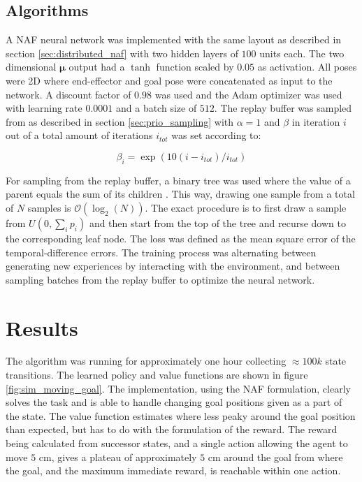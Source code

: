 \subsection{Algorithms}

A NAF neural network was implemented with the same layout as described in
section \ref{sec:distributed_naf} with two hidden layers of $100$ units each.
The two dimensional $\mathbf{\mu}$ output had a $\tanh$ function scaled by $0.05$ as
activation. All poses were 2D where end-effector and goal pose were
concatenated as input to the network. A discount factor of $0.98$ was used and
the Adam optimizer \cite{kingma2014adam} was used with learning rate $0.0001$
and a batch size of $512$. The replay buffer was sampled from as described in
section \ref{sec:prio_sampling} with $\alpha = 1$ and $\beta$ in iteration $i$
out of a total amount of iterations $i_{tot}$ was set according to:

\begin{equation}
    \beta_i = \exp \left( 10(i - i_{tot}) / i_{tot}\right)
\end{equation}

For sampling from the replay buffer, a binary tree was used where the value of
a parent equals the sum of its children \cite{schaul2015prioritized}. This way,
drawing one sample from a total of $N$ samples is $\mathcal{O}(\log_2(N))$. The
exact procedure is to first draw a sample from $U(0, \sum_i p_i)$ and then
start from the top of the tree and recurse down to the corresponding leaf node.
The loss was defined as the mean square error of the temporal-difference
errors. The training process was alternating between generating new experiences
by interacting with the environment, and between sampling batches from the
replay buffer to optimize the neural network.


\section{Results}

The algorithm was running for approximately one hour collecting $\approx 100k$
state transitions. The learned policy and value functions are shown in figure
\ref{fig:sim_moving_goal}. The implementation, using the NAF formulation,
clearly solves the task and is able to handle changing goal positions given as
a part of the state. The value function estimates where less peaky around the
goal position than expected, but has to do with the formulation of the reward.
The reward being calculated from successor states, and a single action allowing
the agent to move $5$ cm, gives a plateau of approximately $5$ cm around the
goal from where the goal, and the maximum immediate reward, is reachable within
one action.

